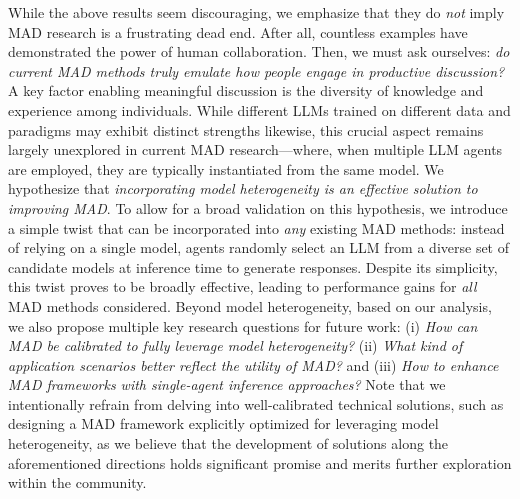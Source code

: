 
While the above results seem discouraging, we emphasize that they do \emph{not} imply MAD research is a frustrating dead end. After all, countless examples have demonstrated the power of human collaboration. 
Then, we must ask ourselves: \emph{do current MAD methods truly emulate how people engage in productive discussion?}
A key factor enabling meaningful discussion is the diversity of knowledge and experience among individuals. While different LLMs trained on different data and paradigms may exhibit distinct strengths likewise, this crucial aspect remains largely unexplored in current MAD research---where, when multiple LLM agents are employed, they are typically instantiated from the same model.
We hypothesize that \emph{incorporating model heterogeneity is an effective solution to improving MAD}.
To allow for a broad validation on this hypothesis, we introduce a simple twist that can be incorporated into \emph{any} existing MAD methods: instead of relying on a single model, agents randomly select an LLM from a diverse set of candidate models at inference time to generate responses. 
Despite its simplicity, this twist proves to be broadly effective, leading to performance gains for \emph{all} MAD methods considered.
Beyond model heterogeneity, based on our analysis, we also propose multiple key research questions for future work: (i) \emph{How can MAD be calibrated to fully leverage model heterogeneity?} (ii) \emph{What kind of application scenarios better reflect the utility of MAD?} and (iii) \emph{How to enhance MAD frameworks with single-agent inference approaches?}
Note that we intentionally refrain from delving into well-calibrated technical solutions, such as designing a MAD framework explicitly optimized for leveraging model heterogeneity, as we believe that the development of solutions along the aforementioned directions holds significant promise and merits further exploration within the community.


